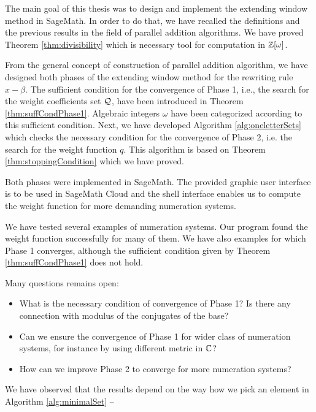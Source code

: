 The main goal of this thesis was to design and implement the extending window method in SageMath. In order to do that, we have recalled the definitions and the previous results in the field of parallel addition algorithms. We have proved Theorem \ref{thm:divisibility} which is necessary tool for computation in $\mathbb{Z}[\omega]$.

From the general concept of construction of parallel addition algorithm, we have designed both phases of the extending window method for the rewriting rule $x-\beta$. The sufficient condition for the convergence of Phase 1, i.e., the search for the weight coefficients set $\mathcal{Q}$, have been introduced in Theorem \ref{thm:suffCondPhase1}. Algebraic integers $\omega$ have been categorized according to this sufficient condition. Next, we have developed Algorithm \ref{alg:oneletterSets} which checks the necessary condition for the convergence of Phase 2, i.e. the search for the weight function $q$. This algorithm is based on Theorem \ref{thm:stoppingCondition} which we have proved.

Both phases were implemented in SageMath. The provided graphic user interface is  to be used in SageMath Cloud and the shell interface enables us to compute the weight function for more demanding numeration systems.

We have tested several examples of numeration systems. Our program found the weight function successfully for many of them. We have also examples for which Phase 1 converges, although the sufficient condition given by Theorem \ref{thm:suffCondPhase1} does not hold. 

Many questions remains open:
\begin{itemize}
\item What is the necessary condition of convergence of Phase 1? Is there any connection with modulus of the conjugates of the base?
\item Can we ensure the convergence of Phase 1 for wider class of numeration systems, for instance by using different metric in $\mathbb{C}$?
\item How can we improve Phase 2 to converge for more numeration systems?
\end{itemize}



We have observed that the results depend on the way how we pick an element in Algorithm \ref{alg:minimalSet} -- 